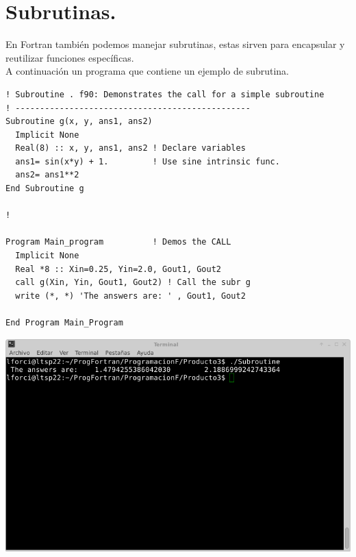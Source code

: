 \documentclass[10pt]{article}
\begin{document}
\section{Subrutinas.}
En Fortran también podemos manejar subrutinas, estas sirven para encapsular y reutilizar funciones específicas.\\
A continuación un programa que contiene un ejemplo de subrutina.
\begin{verbatim}
! Subroutine . f90: Demonstrates the call for a simple subroutine
! ------------------------------------------------
Subroutine g(x, y, ans1, ans2)
  Implicit None
  Real(8) :: x, y, ans1, ans2 ! Declare variables
  ans1= sin(x*y) + 1.         ! Use sine intrinsic func.
  ans2= ans1**2
End Subroutine g

!

Program Main_program          ! Demos the CALL
  Implicit None
  Real *8 :: Xin=0.25, Yin=2.0, Gout1, Gout2
  call g(Xin, Yin, Gout1, Gout2) ! Call the subr g
  write (*, *) 'The answers are: ' , Gout1, Gout2

End Program Main_Program

\end{verbatim}
\includegraphics[scale=0.6]{Subroutine}
\end{document}
